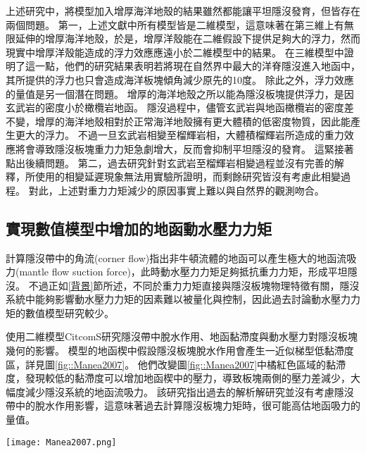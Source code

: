 上述研究中，將模型加入增厚海洋地殼的結果雖然都能讓平坦隱沒發育，但皆存在兩個問題。
第一，上述文獻中所有模型皆是二維模型，這意味著在第三維上有無限延伸的增厚海洋地殼，於是，增厚洋殼能在二維假設下提供足夠大的浮力，然而現實中增厚洋殼能造成的浮力效應應遠小於二維模型中的結果。
\citet{florez2019impact}在三維模型中證明了這一點，他們的研究結果表明若將現在自然界中最大的洋脊隱沒進入地函中，其所提供的浮力也只會造成海洋板塊傾角減少原先的10度。
除此之外，浮力效應的量值是另一個潛在問題。
增厚的海洋地殼之所以能為隱沒板塊提供浮力，是因玄武岩的密度小於橄欖岩地函。
隱沒過程中，儘管玄武岩與地函橄欖岩的密度差不變，增厚的海洋地殼相對於正常海洋地殼擁有更大體積的低密度物質，因此能產生更大的浮力。
不過一旦玄武岩相變至榴輝岩相，大體積榴輝岩所造成的重力效應將會導致隱沒板塊重力力矩急劇增大，反而會抑制平坦隱沒的發育。
這緊接著點出後續問題。
第二，過去研究針對玄武岩至榴輝岩相變過程並沒有完善的解釋，\citet{van2002role}所使用的相變延遲現象無法用實驗所證明，而剩餘研究皆沒有考慮此相變過程。
對此，上述對重力力矩減少的原因事實上難以與自然界的觀測吻合。


\subsection{實現數值模型中增加的地函動水壓力力矩}
\citet{tovish1978mantle}計算隱沒帶中的角流(corner flow)指出非牛頓流體的地函可以產生極大的地函流吸力(mantle flow suction force)，此時動水壓力力矩足夠抵抗重力力矩，形成平坦隱沒。
不過正如\ref{背景}節所述，不同於重力力矩直接與隱沒板塊物理特徵有關，隱沒系統中能夠影響動水壓力力矩的因素難以被量化與控制，因此過去討論動水壓力力矩的數值模型研究較少。

\citet{Manea2007}使用二維模型CitcomS研究隱沒帶中脫水作用、地函黏滯度與動水壓力對隱沒板塊幾何的影響。
模型的地函楔中假設隱沒板塊脫水作用會產生一近似梯型低黏滯度區，詳見圖\ref{fig::Manea2007}。
他們改變圖\ref{fig::Manea2007}中橘紅色區域的黏滯度，發現較低的黏滯度可以增加地函楔中的壓力，導致板塊兩側的壓力差減少，大幅度減少隱沒系統的地函流吸力。
該研究指出過去\citet{tovish1978mantle}的解析解研究並沒有考慮隱沒帶中的脫水作用影響，這意味著過去計算隱沒板塊力矩時，很可能高估地函吸力的量值。

\begin{figure*}[ht!]
    \centering
    \texttt{[image: Manea2007.png]}
    \caption[\citet{Manea2007}模型中所設定的低黏滯度近似梯形區與低黏滯度通道區域]{\citet{Manea2007}模型中所設定的低黏滯度近似梯形區(LVW, low viscosity wedge)與低黏滯度通道(LVC, low viscosity channel)區域，表示隱沒帶的脫水作用對地函楔造成的影響。其中h$_{min}$、h$_{max}$、d$_{lvc}$皆為模型中可調整的參數，用以控制低黏滯度近似梯形區與低黏滯度通道的範圍與深度。}
    \label{fig::Manea2007}
\end{figure*}

